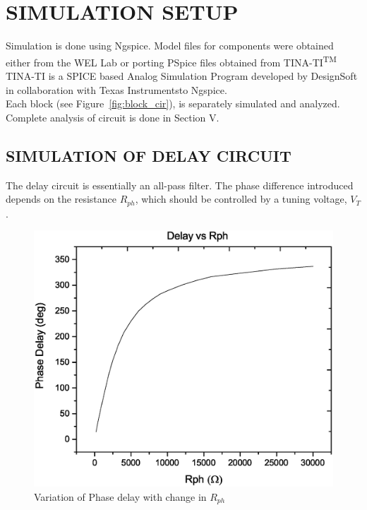 \documentclass[10pt, conference]{IEEEtran}
\begin{document}


\section{SIMULATION SETUP}
Simulation is done using Ngspice. Model files for components were obtained either from the WEL Lab or porting PSpice files obtained from TINA-TI\textsuperscript{TM} \small{TINA-TI is a SPICE based Analog Simulation Program developed by DesignSoft in collaboration with Texas Instruments}\normalsize to Ngspice.\\
Each block (see Figure~\ref{fig:block_cir}), is separately simulated and analyzed. Complete analysis of circuit is done in Section V.

\subsection{SIMULATION OF DELAY CIRCUIT}
The delay circuit is essentially an all-pass filter.
The phase difference introduced depends on the resistance $R_{ph}$, which should be controlled by a tuning voltage, $V_T$.

\begin{figure}[H]
    \centering
    \includegraphics[width=\columnwidth]{Delay_vs_Rph.eps}
    \caption{Variation of Phase delay with change in $R_{ph}$}
    \label{fig:delay_vs_Rph}
\end{figure}
\end{document}
